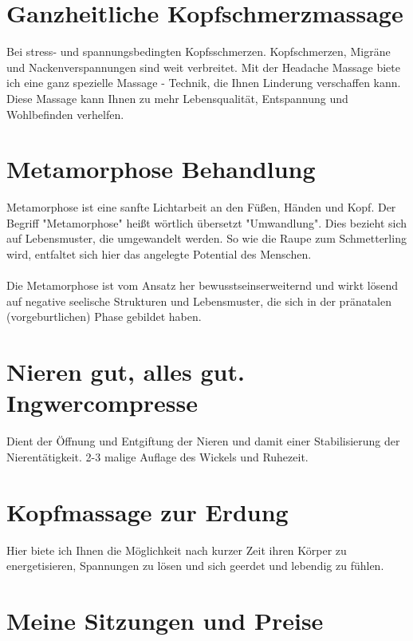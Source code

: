 \documentclass[10pt,foldmark,notumble]{leaflet}
\begin{document}
\section{Ganzheitliche Kopfschmerzmassage}

Bei stress- und spannungsbedingten Kopfsschmerzen. 
Kopfschmerzen, Migräne und Nackenverspannungen sind weit verbreitet. Mit der Headache Massage biete ich eine ganz spezielle Massage - Technik, die Ihnen Linderung verschaffen kann. Diese Massage kann Ihnen zu mehr Lebensqualität, Entspannung und Wohlbefinden verhelfen. 

\section{Metamorphose Behandlung}

Metamorphose ist eine sanfte Lichtarbeit an den Füßen, Händen und Kopf. Der Begriff "Metamorphose" heißt wörtlich übersetzt "Umwandlung". Dies bezieht sich auf Lebensmuster, die umgewandelt werden. So wie die Raupe zum Schmetterling wird, entfaltet sich hier das angelegte Potential des Menschen.\\
\\
Die Metamorphose ist vom Ansatz her bewusstseins\-erweiternd und wirkt lösend auf negative seelische Strukturen und Lebensmuster, die sich in der pränatalen (vorgeburtlichen) Phase gebildet haben.



\section{Nieren gut, alles gut. \\Ingwercompresse}
Dient der Öffnung und Entgiftung der Nieren und damit einer Stabilisierung der Nierentätigkeit. 2-3 malige Auflage des Wickels und Ruhezeit. 

\section{Kopfmassage zur Erdung}
Hier biete ich Ihnen die Möglichkeit nach kurzer Zeit ihren Körper zu energetisieren, Spannungen zu lösen und sich geerdet und lebendig zu fühlen. 

\newpage
\section{Meine Sitzungen und Preise}
\end{document}
